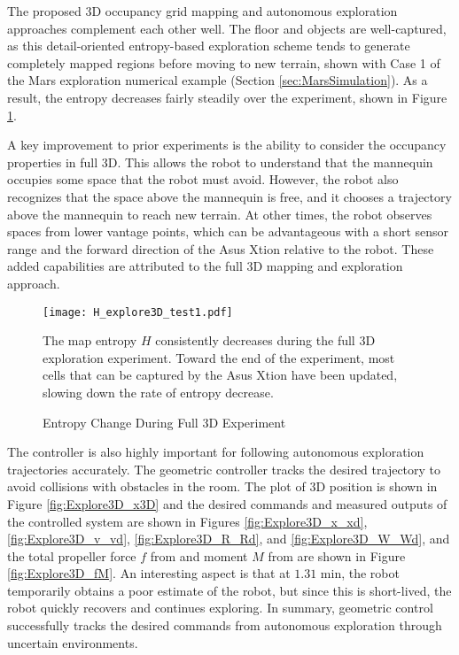 The proposed 3D occupancy grid mapping and autonomous exploration approaches complement each other well. The floor and objects are well-captured, as this detail-oriented entropy-based exploration scheme tends to generate completely mapped regions before moving to new terrain, shown with Case 1 of the Mars exploration numerical example (Section \ref{sec:MarsSimulation}). As a result, the entropy decreases fairly steadily over the experiment, shown in Figure \ref{fig:Explore3D_H}.

A key improvement to prior experiments is the ability to consider the occupancy properties in full 3D. This allows the robot to understand that the mannequin occupies some space that the robot must avoid. However, the robot also recognizes that the space above the mannequin is free, and it chooses a trajectory above the mannequin to reach new terrain. At other times, the robot observes spaces from lower vantage points, which can be advantageous with a short sensor range and the forward direction of the Asus Xtion relative to the robot. These added capabilities are attributed to the full 3D mapping and exploration approach.

\begin{figure}
	\centering
	\texttt{[image: H\_explore3D\_test1.pdf]}
	\caption{Entropy Change During Full 3D Experiment}
	\medskip
	\small
	The map entropy $H$ consistently decreases during the full 3D exploration experiment. Toward the end of the experiment, most cells that can be captured by the Asus Xtion have been updated, slowing down the rate of entropy decrease.
	\label{fig:Explore3D_H}
\end{figure}

The controller is also highly important for following autonomous exploration trajectories accurately. The geometric controller tracks the desired trajectory to avoid collisions with obstacles in the room. The plot of 3D position is shown in Figure \ref{fig:Explore3D_x3D} and the desired commands and measured outputs of the controlled system are shown in Figures \ref{fig:Explore3D_x_xd}, \ref{fig:Explore3D_v_vd}, \ref{fig:Explore3D_R_Rd}, and \ref{fig:Explore3D_W_Wd}, and the total propeller force $f$ from  and moment $M$ from  are shown in Figure \ref{fig:Explore3D_fM}. An interesting aspect is that at $1.31$ min, the robot temporarily obtains a poor estimate of the robot, but since this is short-lived, the robot quickly recovers and continues exploring. In summary, geometric control successfully tracks the desired commands from autonomous exploration through uncertain environments.

